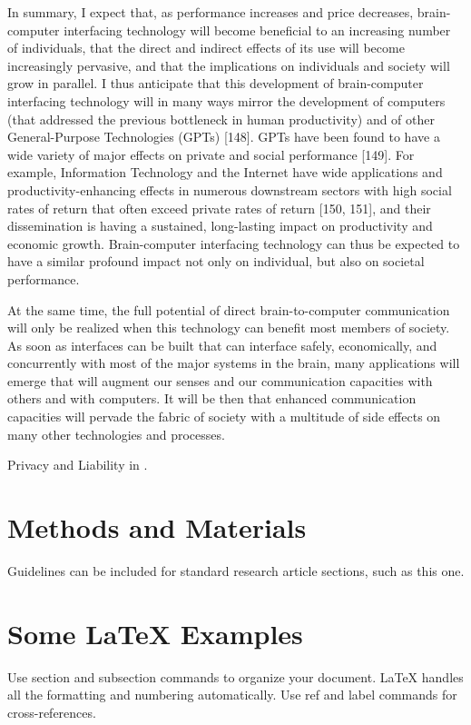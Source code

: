 \documentclass[fleqn,11pt]{olplainarticle}
\begin{document}
In summary, I expect that, as performance increases and price decreases, brain- computer interfacing technology will become beneficial to an increasing number of individuals, that the direct and indirect effects of its use will become increasingly pervasive, and that the implications on individuals and society will grow in parallel. I thus anticipate that this development of brain-computer interfacing technology will in many ways mirror the development of computers (that addressed the previous bottleneck in human productivity) and of other General-Purpose Technologies (GPTs) [148]. GPTs have been found to have a wide variety of major effects on private and social performance [149]. For example, Information Technology and the Internet have wide applications and productivity-enhancing effects in numerous downstream sectors with high social rates of return that often exceed private rates of return [150, 151], and their dissemination is having a sustained, long-lasting impact on productivity and economic growth. Brain-computer interfacing technology can thus be expected to have a similar profound impact not only on individual, but also on societal performance.
\cite{schalk2008brain}

At the same time, the full potential of direct brain-to-computer communication will only be realized when this technology can benefit most members of society. As soon as interfaces can be built that can interface safely, economically, and concurrently with most of the major systems in the brain, many applications will emerge that will augment our senses and our communication capacities with others and with computers. It will be then that enhanced communication capacities will pervade the fabric of society with a multitude of side effects on many other technologies and processes.\cite{schalk2008brain}

Privacy and Liability in \cite{schalk2008brain}.

\section*{Methods and Materials}

Guidelines can be included for standard research article sections, such as this one.

\section*{Some \LaTeX{} Examples}
\label{sec:examples}

Use section and subsection commands to organize your document. \LaTeX{} handles all the formatting and numbering automatically. Use ref and label commands for cross-references.
\end{document}
